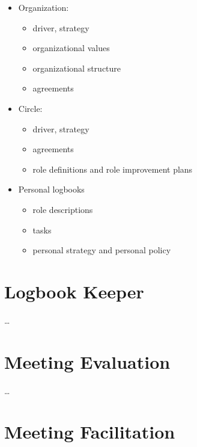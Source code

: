 \begin{itemize}
\item Organization:

\begin{itemize}
\item driver, strategy

\item organizational values

\item organizational structure

\item agreements

\end{itemize}

\item Circle:

\begin{itemize}
\item driver, strategy

\item agreements

\item role definitions and role improvement plans

\end{itemize}

\item Personal logbooks

\begin{itemize}
\item role descriptions

\item tasks

\item personal strategy and personal policy

\end{itemize}

\end{itemize}

\section{Logbook Keeper}
\label{logbookkeeper}

{\ldots}

\section{Meeting Evaluation}
\label{meetingevaluation}

{\ldots}

\section{Meeting Facilitation}
\label{meetingfacilitation}

